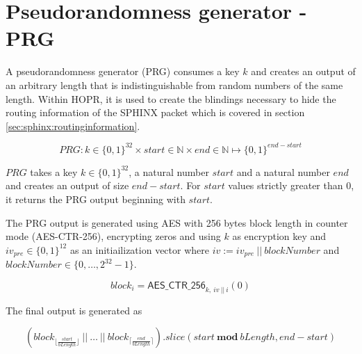 \section{Pseudorandomness generator - PRG}
\label{appendix:prg}

A pseudorandomness generator (PRG) consumes a key $k$ and creates an output of an arbitrary length that is indistinguishable from random numbers of the same length. Within HOPR, it is used to create the blindings necessary to hide the routing information of the SPHINX packet which is covered in section \ref{sec:sphinx:routinginformation}.

$$ PRG : k \in \{ 0,1 \}^{32} \times start \in \mathbb{N} \times end \in \mathbb{N} \mapsto \{ 0,1 \}^{end - start} $$

$PRG$ takes a key $k \in \{ 0,1 \}^{32}$, a natural number $start$ and a natural number $end$ and creates an output of size $end - start$. For $start$ values strictly greater than $0$, it returns the PRG output beginning with $start$.

The PRG output is generated using AES with 256 bytes block length in counter mode (AES-CTR-256), encrypting zeros and using $k$ as encryption key and $iv_{pre} \in \{ 0, 1 \}^{12}$ as an initiailization vector where $iv := iv_{pre} \ || \ blockNumber$ and $blockNumber \in \{ 0, \dots, 2^{32} - 1 \}$.

$$ block_i = \mathsf{AES\_CTR\_256}_{k, \ iv \ || \ i}(0) $$

The final output is generated as

$$ ( block_{\lfloor \frac{start}{bLength}\rfloor} \ || \ \dots \ || \ block_{\lceil \frac{end}{bLength}\rceil} ).slice(start \ \textbf{mod} \ bLength,end - start)$$

